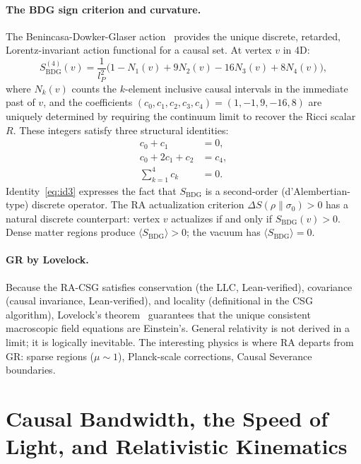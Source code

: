 \documentclass[11pt,a4paper]{article}
\newcommand{\SBDG}{S_{\mathrm{BDG}}}
\begin{document}
\paragraph{The BDG sign criterion and curvature.}
The Benincasa-Dowker-Glaser action~\citep{Benincasa2010} provides the unique
discrete, retarded, Lorentz-invariant action functional for a causal set.
At vertex $v$ in 4D:
\begin{equation}
  \SBDG^{(4)}(v)
  = \frac{1}{l_P^2}\bigl(1 - N_1(v) + 9N_2(v) - 16N_3(v) + 8N_4(v)\bigr),
  \label{eq:BDG_4d}
\end{equation}
where $N_k(v)$ counts the $k$-element inclusive causal intervals in the
immediate past of $v$, and the coefficients $(c_0,c_1,c_2,c_3,c_4)=(1,-1,9,-16,8)$
are uniquely determined by requiring the continuum limit to recover the
Ricci scalar $R$.  These integers satisfy three structural identities:
\begin{align}
  c_0 + c_1 &= 0, \label{eq:id1} \\
  c_0 + 2c_1 + c_2 &= c_4, \label{eq:id2} \\
  \sum_{k=1}^{4} c_k &= 0. \label{eq:id3}
\end{align}
Identity~\eqref{eq:id3} expresses the fact that $\SBDG$ is a second-order
(d'Alembertian-type) discrete operator.  The RA actualization criterion
$\Delta S(\rho\|\sigma_0) > 0$ has a natural discrete counterpart: vertex
$v$ actualizes if and only if $\SBDG(v) > 0$.  Dense matter regions produce
$\langle \SBDG \rangle > 0$; the vacuum has $\langle \SBDG \rangle = 0$.

\paragraph{GR by Lovelock.}
Because the RA-CSG satisfies conservation (the LLC, Lean-verified), covariance
(causal invariance, Lean-verified), and locality (definitional in the CSG
algorithm), Lovelock's theorem~\citep{Lovelock1971} guarantees that the unique
consistent macroscopic field equations are Einstein's. General relativity is
not derived in a limit; it is logically inevitable. The interesting physics
is where RA departs from GR: sparse regions ($\mu \sim 1$), Planck-scale
corrections, Causal Severance boundaries.

\section{Causal Bandwidth, the Speed of Light, and Relativistic Kinematics}
\label{sec:bandwidth}
\end{document}
